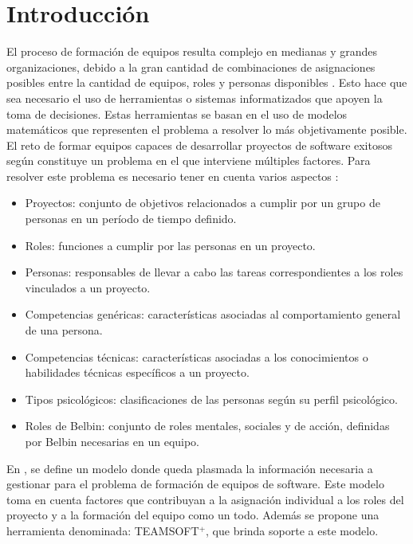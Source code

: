 \chapter*{Introducción}

El proceso de formación de equipos resulta complejo en medianas y grandes organizaciones, debido a la gran cantidad de combinaciones de asignaciones posibles entre la cantidad de equipos, roles y personas disponibles \cite{Mayi09}. Esto hace que sea necesario el uso de herramientas o sistemas informatizados que apoyen la toma de decisiones. Estas herramientas se basan en el uso de modelos matemáticos que representen el problema a resolver lo más objetivamente posible.\\ 

El reto de formar equipos capaces de desarrollar proyectos de software exitosos según \cite{ana14} constituye un problema en el que interviene múltiples factores. Para resolver este problema es necesario tener en cuenta varios aspectos \cite{ana15}:
\begin{itemize}
	
\item Proyectos: conjunto de objetivos relacionados a cumplir por un grupo de personas en un período de tiempo definido.

\item Roles: funciones a cumplir por las personas en un proyecto.

\item Personas: responsables de llevar a cabo las tareas correspondientes a los roles vinculados a un proyecto.

\item Competencias genéricas: características asociadas al comportamiento general de una persona.

\item Competencias técnicas: características asociadas a los conocimientos o habilidades técnicas específicos a un proyecto. 

\item Tipos psicológicos: clasificaciones de las personas según su perfil psicológico.

\item Roles de Belbin: conjunto de roles mentales, sociales y de acción, definidas por Belbin necesarias en un equipo.

\end{itemize}	

En \cite{Mayi09}, se define un modelo donde queda plasmada la información necesaria a gestionar para el problema de formación de equipos de software. Este modelo toma en cuenta factores que contribuyan a la asignación individual a los roles del proyecto y a la formación del equipo como un todo. Además se propone una herramienta denominada: TEAMSOFT$^+$, que brinda soporte a este modelo.\\

